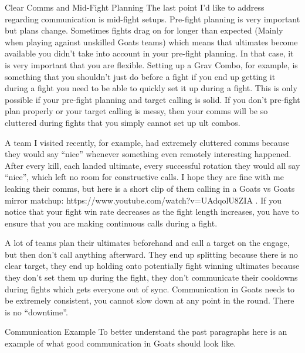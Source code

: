Clear Comms and Mid-Fight Planning
The last point I’d like to address regarding communication is mid-fight setups. Pre-fight planning is very important but plans change. Sometimes fights drag on for longer than expected (Mainly when playing against unskilled Goats teams) which means that ultimates become available you didn’t take into account in your pre-fight planning. In that case, it is very important that you are flexible. 
Setting up a Grav Combo, for example, is something that you shouldn’t just do before a fight if you end up getting it during a fight you need to be able to quickly set it up during a fight. This is only possible if your pre-fight planning and target calling is solid. If you don’t pre-fight plan properly or your target calling is messy, then your comms will be so cluttered during fights that you simply cannot set up ult combos.

A team I visited recently, for example, had extremely cluttered comms because they would say “nice” whenever something even remotely interesting happened. After every kill, each landed ultimate, every successful rotation they would all say “nice”, which left no room for constructive calls. I hope they are fine with me leaking their comms, but here is a short clip of them calling in a Goats vs Goats mirror matchup: https://www.youtube.com/watch?v=UAdqolU8ZIA . If you notice that your fight win rate decreases as the fight length increases, you have to ensure that you are making continuous calls during a fight.

A lot of teams plan their ultimates beforehand and call a target on the engage, but then don’t call anything afterward. They end up splitting because there is no clear target, they end up holding onto potentially fight winning ultimates because they don’t set them up during the fight, they don’t communicate their cooldowns during fights which gets everyone out of sync. Communication in Goats needs to be extremely consistent, you cannot slow down at any point in the round. There is no “downtime”.







Communication Example
To better understand the past paragraphs here is an example of what good communication in Goats should look like.

